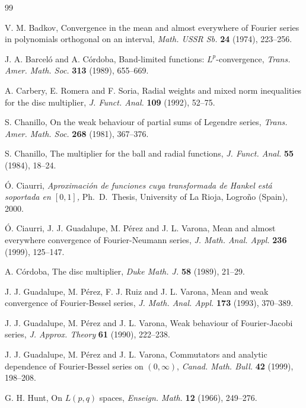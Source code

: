 \documentclass{amsart}
\theoremstyle{plain}
\begin{document}
\begin{thebibliography}{99}

V. M. Badkov,
{Convergence in the mean and almost everywhere of Fourier series in
polynomials orthogonal on an interval},
\textit{Math. USSR Sb.}
\textbf{24} (1974), 223--256.

 J. A. Barcel\'o and A. C\'ordoba,
{Band-limited functions: $L^p$-convergence},
\textit{Trans. Amer. Math. Soc.}
\textbf{313} (1989), 655--669.

 A. Carbery, E. Romera and F. Soria,
{Radial weights and mixed norm inequalities for the disc multiplier},
\textit{J. Funct. Anal.}
\textbf{109} (1992), 52--75.

 S. Chanillo,
{On the weak behaviour of partial sums of Legendre series},
\textit{Trans. Amer. Math. Soc.}
\textbf{268} (1981), 367--376.

 S. Chanillo,
{The multiplier for the ball and radial functions},
\textit{J. Funct. Anal.}
\textbf{55} (1984), 18--24.

 \'O. Ciaurri,
{\it Aproximaci\'on de funciones cuya transformada de Hankel est\'a soportada
en $[0,1]$,}
Ph.~D.~Thesis, University of La Rioja, Logro\~no (Spain), 2000.

 \'O. Ciaurri, J. J. Guadalupe, M. P\'erez and J. L. Varona,
{Mean and almost everywhere convergence of Fourier-Neumann series},
\textit{J. Math. Anal. Appl.}
\textbf{236} (1999), 125--147.

 A. C\'ordoba,
{The disc multiplier},
\textit{Duke Math. J.}
\textbf{58} (1989), 21--29.


 J. J. Guadalupe, M. P\'erez, F. J. Ruiz and J. L. Varona,
{Mean and weak convergence of Fourier-Bessel series},
\textit{J. Math. Anal. Appl.}
\textbf{173} (1993), 370--389.

 J. J. Guadalupe, M. P\'erez and J. L. Varona,
{Weak behaviour of Fourier-Jacobi series},
\textit{J. Approx. Theory}
\textbf{61} (1990), 222--238.

 J. J. Guadalupe, M. P\'erez and J. L. Varona,
{Commutators and analytic dependence of Fourier-Bessel series on
$(0,\infty)$},
\textit{Canad. Math. Bull.}
\textbf{42} (1999), 198--208.

 G. H. Hunt,
{On $L(p,q)$ spaces},
\textit{Enseign. Math.}
\textbf{12} (1966), 249--276.


\end{thebibliography}
\end{document}

